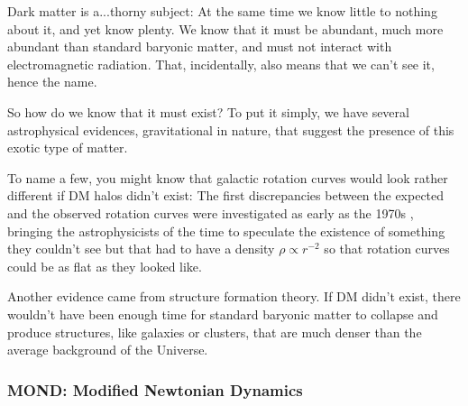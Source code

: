 Dark matter is a...thorny subject: At the same time we know little to nothing about it, and yet know plenty. We know that it must be abundant, much more abundant than standard baryonic matter, and must not interact with electromagnetic radiation. That, incidentally, also means that we can't see it, hence the name.
\par So how do we know that it must exist? To put it simply, we have several astrophysical evidences, gravitational in nature, that suggest the presence of this exotic type of matter.
\par To name a few, you might know that galactic rotation curves would look rather different if DM halos didn't exist: The first discrepancies between the expected and the observed rotation curves were investigated as early as the 1970s \cite{1978PhDT.......195B}, \cite{1978ApJ...225L.107R} bringing the astrophysicists of the time to speculate the existence of something they couldn't see but that had to have a density $\rho \propto r^{-2}$ so that rotation curves could be as flat as they looked like.
\par Another evidence came from structure formation theory. If DM didn't exist, there wouldn't have been enough time for standard baryonic matter to collapse and produce structures, like galaxies or clusters, that are much denser than the average background of the Universe.

\subsubsection{MOND: Modified Newtonian Dynamics}

